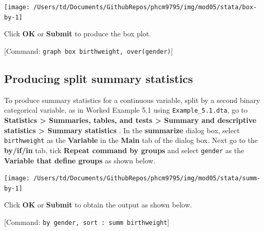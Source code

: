 \documentclass[
]{memoir}
\begin{document}
\texttt{[image: /Users/td/Documents/GithubRepos/phcm9795/img/mod05/stata/box-by-1]}

Click \textbf{OK} or \textbf{Submit} to produce the box plot.

{[}Command: \texttt{graph\ box\ birthweight,\ over(gender)}{]}

\hypertarget{producing-split-summary-statistics}{%
\subsection{Producing split summary statistics}\label{producing-split-summary-statistics}}

To produce summary statistics for a continuous variable, split by a second binary categorical variable, as in Worked Example 5.1 using \texttt{Example\_5.1.dta}, go to \textbf{Statistics \textgreater{} Summaries, tables, and tests \textgreater{} Summary and descriptive statistics \textgreater{} Summary statistics} . In the \textbf{summarize} dialog box, select \texttt{birthweight} as the \textbf{Variable} in the \textbf{Main} tab of the dialog box. Next go to the \textbf{by/if/in} tab, tick \textbf{Repeat command by groups} and select \texttt{gender} as the \textbf{Variable that define groups} as shown below.

\texttt{[image: /Users/td/Documents/GithubRepos/phcm9795/img/mod05/stata/summ-by-1]}

Click \textbf{OK} or \textbf{Submit} to obtain the output as shown below.

{[}Command: \texttt{by\ gender,\ sort\ :\ summ\ birthweight}{]}
\end{document}
